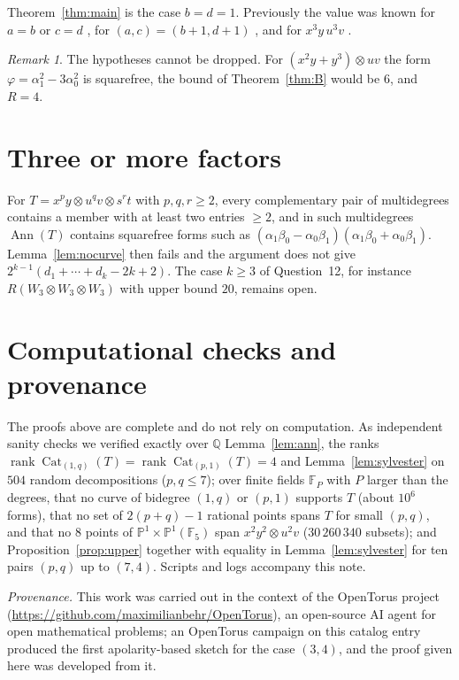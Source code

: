 \documentclass[11pt]{amsart}
\theoremstyle{remark}
\newtheorem{remark}[theorem]{Remark}
\newcommand{\PP}{\mathbb{P}}
\DeclareMathOperator{\Ann}{Ann}
\DeclareMathOperator{\Cat}{Cat}
\DeclareMathOperator{\rank}{rank}
\begin{document}
Theorem~\ref{thm:main} is the case $b=d=1$. Previously the value was known for $a=b$ or $c=d$ \cite[Thm.~1.5(ii)]{Gal}, for $(a,c)=(b+1,d+1)$ \cite[Thm.~1.5(i),(iii)]{Gal}, and for $x^3y\,u^3v$ \cite{GalNote}.

\begin{remark}
The hypotheses cannot be dropped. For $(x^2y+y^3)\otimes uv$ the form $\varphi=\alpha_1^2-3\alpha_0^2$ is squarefree, the bound of Theorem~\ref{thm:B} would be $6$, and $R=4$.
\end{remark}

\section{Three or more factors}\label{sec:k3}

For $T=x^py\otimes u^qv\otimes s^rt$ with $p,q,r\ge2$, every complementary pair of multidegrees contains a member with at least two entries $\ge2$, and in such multidegrees $\Ann(T)$ contains squarefree forms such as $(\alpha_1\beta_0-\alpha_0\beta_1)(\alpha_1\beta_0+\alpha_0\beta_1)$. Lemma~\ref{lem:nocurve} then fails and the argument does not give $2^{k-1}(d_1+\cdots+d_k-2k+2)$. The case $k\ge3$ of Question~12, for instance $R(W_3\otimes W_3\otimes W_3)$ with upper bound $20$, remains open.

\section{Computational checks and provenance}

The proofs above are complete and do not rely on computation. As independent sanity checks we verified exactly over $\mathbb Q$ Lemma~\ref{lem:ann}, the ranks $\rank\Cat_{(1,q)}(T)=\rank\Cat_{(p,1)}(T)=4$ and Lemma~\ref{lem:sylvester} on $504$ random decompositions ($p,q\le7$); over finite fields $\mathbb F_P$ with $P$ larger than the degrees, that no curve of bidegree $(1,q)$ or $(p,1)$ supports $T$ (about $10^6$ forms), that no set of $2(p+q)-1$ rational points spans $T$ for small $(p,q)$, and that no $8$ points of $\PP^1\times\PP^1(\mathbb F_5)$ span $x^2y^2\otimes u^2v$ ($30\,260\,340$ subsets); and Proposition~\ref{prop:upper} together with equality in Lemma~\ref{lem:sylvester} for ten pairs $(p,q)$ up to $(7,4)$. Scripts and logs accompany this note.

\emph{Provenance.} This work was carried out in the context of the OpenTorus project (\url{https://github.com/maximilianbehr/OpenTorus}), an open-source AI agent for open mathematical problems; an OpenTorus campaign on this catalog entry produced the first apolarity-based sketch for the case $(3,4)$, and the proof given here was developed from it.
\end{document}

